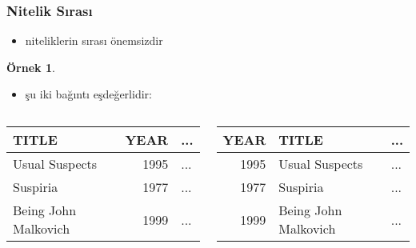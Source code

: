 \documentclass[dvipsnames]{beamer}
\theoremstyle{definition}
\theoremstyle{example}
\newtheorem{ornek}[theorem]{Örnek}
\theoremstyle{plain}
\begin{document}
\begin{frame}
  \frametitle{Nitelik Sırası}

  \begin{itemize}
    \item niteliklerin sırası önemsizdir
  \end{itemize}

  \pause
  \begin{ornek}
    \begin{itemize}
      \item şu iki bağıntı eşdeğerlidir:
    \end{itemize}

    \begin{columns}
      \begin{tiny}
      \begin{table}
        \begin{tabular}{|l|r|l|}\hline
TITLE                & YEAR & ...\\\hline\hline
Usual Suspects       & 1995 & ...\\\hline
Suspiria             & 1977 & ...\\\hline
Being John Malkovich & 1999 & ...\\\hline
        \end{tabular}
      \end{table}
      \end{tiny}

      \begin{tiny}
      \begin{table}
        \begin{tabular}{|r|l|l|}\hline
YEAR & TITLE                & ...\\\hline\hline
1995 & Usual Suspects       & ...\\\hline
1977 & Suspiria             & ...\\\hline
1999 & Being John Malkovich & ...\\\hline
        \end{tabular}
      \end{table}
      \end{tiny}
    \end{columns}
  \end{ornek}
\end{frame}
\end{document}
